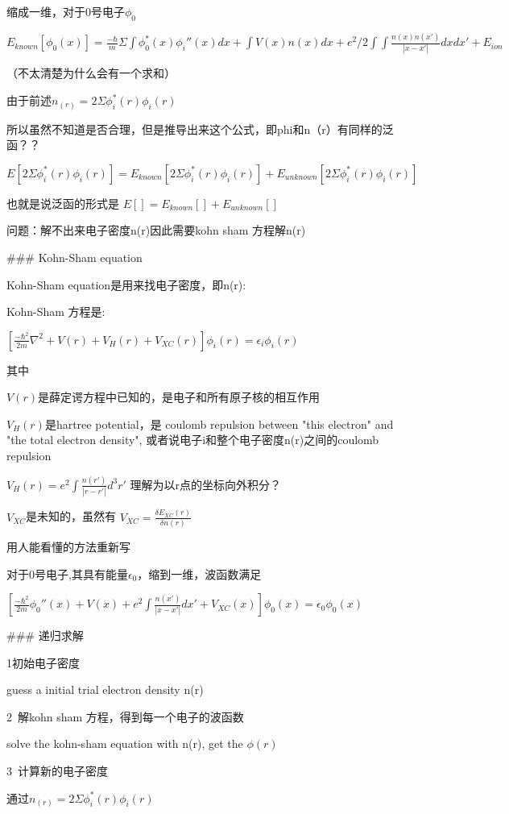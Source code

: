 \documentclass{article}
\begin{document}
缩成一维，对于0号电子$\phi_0$

$E_{known}[\phi_0(x)]=\frac{-\hbar}{m}\Sigma\int\phi_0^*(x)\phi_i''(x)dx+\int V(x)n(x)dx+e^2/2\int \int \frac {n(x)n(x')}{|x-x'|}dxdx'+E_{ion} $

（不太清楚为什么会有一个求和）

由于前述$n_{(r)} = 2\Sigma \phi_i^*(r)\phi_i(r)$

所以虽然不知道是否合理，但是推导出来这个公式，即phi和n（r）有同样的泛函？？

$E[2\Sigma \phi_i^*(r)\phi_i(r)]=E_{known}[2\Sigma \phi_i^*(r)\phi_i(r)]+E_{unknown}[2\Sigma \phi_i^*(r)\phi_i(r)]$

也就是说泛函的形式是 
$E[]=E_{known}[]+E_{unknown}[]$

问题：解不出来电子密度n(r)因此需要kohn sham 方程解n(r)

### Kohn-Sham equation

Kohn-Sham equation是用来找电子密度，即n(r):

Kohn-Sham 方程是:

$[\frac{-\hbar^2}{2m}\nabla^2+V(r)+V_H(r)+V_{XC}(r)]\phi_i(r)=\epsilon_i\phi_i(r)$

其中

$V(r)$是薛定谔方程中已知的，是电子和所有原子核的相互作用

$V_H(r)$是hartree potential，是 coulomb repulsion  between "this electron" and "the total electron density", 或者说电子i和整个电子密度n(r)之间的coulomb repulsion

$V_H(r)=e^2\int \frac{n(r')}{|r-r'|}d^3r'$
理解为以r点的坐标向外积分？

$V_{XC}$是未知的，虽然有
$V_{XC}=\frac{\delta E_{XC}(r)}{\delta n(r)} $

用人能看懂的方法重新写

对于0号电子,其具有能量$\epsilon_0$，缩到一维，波函数满足

$[\frac{-\hbar^2}{2m}\phi_0''(x)+V(x)+e^2\int \frac{n(x')}{|x-x'|}dx'+V_{XC}(x)]\phi_0(x)=\epsilon_0\phi_0(x)$

### 递归求解

1 初始电子密度

guess a initial trial electron density n(r)

2\ 解kohn sham 方程，得到每一个电子的波函数

solve the kohn-sham equation with n(r), get the $\phi(r)$

3\ 计算新的电子密度

通过$n_{(r)} = 2\Sigma \phi_i^*(r)\phi_i(r)$
\end{document}

